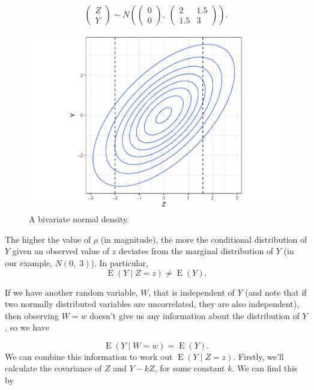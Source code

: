 \documentclass[
  openany]{book}
\theoremstyle{definition}
\theoremstyle{definition}
\theoremstyle{definition}
\theoremstyle{definition}
\theoremstyle{remark}
\begin{document}
\begin{equation}
\begin{pmatrix}
Z\\
Y
\end{pmatrix} \sim N\left(
\begin{pmatrix}
0\\
0
\end{pmatrix},\;
\begin{pmatrix}
2 & 1.5 \\
1.5 & 3
\end{pmatrix}
\right).
\label{eq:bvneg}
\end{equation}

\begin{figure}
\centering
\includegraphics{CT4H_notes_files/figure-latex/bvnplot-1.pdf}
\caption{\label{fig:bvnplot}A bivariate normal density.}
\end{figure}

The higher the value of \(\rho\) (in magnitude), the more the conditional distribution of \(Y\) given an observed value of \(z\) deviates from the marginal distribution of \(Y\) (in our example, \(N\left(0,\;3\right)\)). In particular, \[\operatorname{E}\left(Y\mid{Z=z}\right)\neq{\operatorname{E}\left(Y\right)}.\]

If we have another random variable, \(W\), that is independent of \(Y\) (and note that if two normally distributed variables are uncorrelated, they are also independent), then observing \(W=w\) doesn't give us any information about the distribution of \(Y\), so we have

\[ \operatorname{E}\left(Y\mid{W=w}\right)={\operatorname{E}\left(Y\right)}. \]
We can combine this information to work out \(\operatorname{E}\left(Y\mid{Z=z}\right)\). Firstly, we'll calculate the covariance of \(Z\) and \(Y-kZ\), for some constant \(k\). We can find this by
\end{document}
